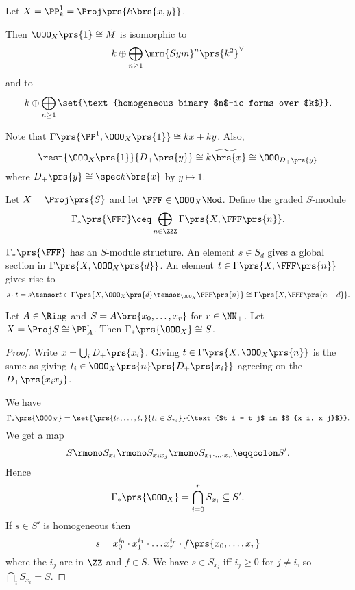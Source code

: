 \documentclass[10pt,a4paper,twoside,openany,hidelinks]{book}
\begin{document}
\begin{example}
Let $X = \PP_k^1 = \Proj\prs{k\brs{x,y}}$.

Then $\OOO_X\prs{1} \cong \tilde{M}$ is isomorphic to \[k \oplus \bigoplus_{n \geq 1} \mrm{Sym}^n\prs{k^2}^\vee\]
and to \[k \oplus \bigoplus_{n \geq 1} \set{\text{homogeneous binary $n$-ic forms over $k$}} \text{.}\]

Note that $\Gamma\prs{\PP^1, \OOO_X\prs{1}} \cong kx + ky$. Also,
\[\rest{\OOO_X\prs{1}}{D_+\prs{y}} \cong \widetilde{k\brs{x}} \cong \OOO_{D_+\prs{y}}\]
where $D_+ \prs{y} \cong \spec k\brs{x}$ by $y \mapsto 1$.
\end{example}

\begin{definition}
Let $X = \Proj\prs{S}$ and let $\FFF \in \OOO_X\Mod$. Define the graded $S$-module
\[\Gamma_*\prs{\FFF} \ceq \bigoplus_{n \in \ZZZ} \Gamma\prs{X, \FFF\prs{n}} \text{.}\]
\end{definition}

\begin{remark}
$\Gamma_*\prs{\FFF}$ has an $S$-module structure. An element $s \in S_d$ gives a global section in $\Gamma\prs{X, \OOO_X\prs{d}}$. An element $t \in \Gamma\prs{X,\FFF\prs{n}}$ gives rise to \[s \cdot t = s \tensor t \in \Gamma\prs{X, \OOO_X\prs{d} \tensor_{\OOO_X} \FFF\prs{n}} \cong \Gamma\prs{X, \FFF\prs{n+d}} \text{.}\]
\end{remark}

\begin{proposition}
Let $A \in \Ring$ and $S = A\brs{x_0, \ldots, x_r}$ for $r \in \NN_+$.
Let $X = \Proj S \cong \PP_A^r$. Then $\Gamma_*\prs{\OOO_X} \cong S$.
\end{proposition}

\begin{proof}
Write $x = \bigcup_{i} D_+\prs{x_i}$. Giving $t \in \Gamma\prs{X, \OOO_X\prs{n}}$ is the same as giving $t_i \in \OOO_X\prs{n} \prs{D_+\prs{x_i}}$ agreeing on the $D_+\prs{x_i x_j}$.

We have
\[\Gamma_*\prs{\OOO_X} = \set{\prs{t_0, \ldots, t_r}{t_i \in S_{x_i}}}{\text{$t_i = t_j$ in $S_{x_i, x_j}$}} \text{.}\]
We get a map
\[S \rmono S_{x_i} \rmono S_{x_i x_j} \rmono S_{x_1 \cdot \ldots \cdot x_r} \eqqcolon S' \text{.}\]
Hence \[\Gamma_*\prs{\OOO_X} = \bigcap_{i = 0}^r S_{x_i} \subseteq S' \text{.}\]
If $s \in S'$ is homogeneous then \[s = x_0^{i_0} \cdot x_1^{i_1} \cdot \ldots x_r^{i_r} \cdot f\prs{x_0, \ldots, x_r}\]
where the $i_j$ are in $\ZZ$ and $f \in S$.
We have $s \in S_{x_i}$ iff $i_j \geq 0$ for $j \neq i$, so $\bigcap_{i} S_{x_i} = S$.
\end{proof}
\end{document}
